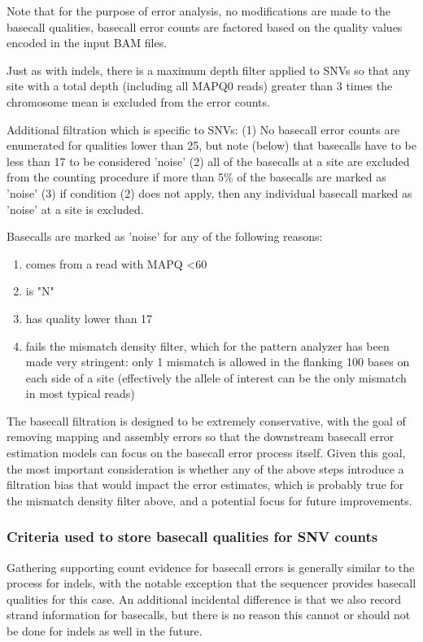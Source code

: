 \documentclass{article}
\begin{document}
Note that for the purpose of error analysis, no modifications are made to the basecall qualities, basecall error counts are factored based on the quality values encoded in the input BAM files.

Just as with indels, there is a maximum depth filter applied to SNVs so that any site with a total depth (including all MAPQ0 reads) greater than 3 times the chromosome mean is excluded from the error counts.

Additional filtration which is specific to SNVs: (1) No basecall error counts are enumerated for qualities lower than 25, but note (below) that basecalls have to be less than 17 to be considered 'noise' (2) all of the basecalls at a site are excluded from the counting procedure if more than 5\% of the basecalls are marked as 'noise' (3) if condition (2) does not apply, then any individual basecall marked as 'noise' at a site is excluded.

Basecalls are marked as 'noise' for any of the following reasons:

\begin{enumerate}
\item comes from a read with MAPQ \textless 60
\item is "N"
\item has quality lower than 17
\item fails the mismatch density filter, which for the pattern analyzer has been made very stringent: only 1 mismatch is allowed in the flanking 100 bases on each side of a site (effectively the allele of interest can be the only mismatch in most typical reads)
\end{enumerate}

The basecall filtration is designed to be extremely conservative, with the goal of removing mapping and assembly errors so that the downstream basecall error estimation models can focus on the basecall error process itself. Given this goal, the most important consideration is whether any of the above steps introduce a filtration bias that would impact the error estimates, which is probably true for the mismatch density filter above, and a potential focus for future improvements.


\subsubsection{Criteria used to store basecall qualities for SNV counts}

Gathering supporting count evidence for basecall errors is generally similar to the process for indels, with the notable exception that the sequencer provides basecall qualities for this case. An additional incidental difference is that we also record strand information for basecalls, but there is no reason this cannot or should not be done for indels as well in the future.
\end{document}
